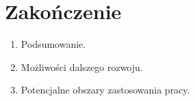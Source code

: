 \documentclass[data-science]{agh-wi} %
\newcounter{comment}[chapter]
\newenvironment{comment}[1][]{\begin{shaded}\refstepcounter{comment}
\noindent \textbf{Uwaga~\thechapter.\thecomment. #1} \rmfamily}{\end{shaded}}
\begin{document}
\chapter{Zakończenie}
\begin{enumerate}
    \item Podsumowanie.
    \item Możliwości dalszego rozwoju.
    \item Potencjalne obszary zastosowania pracy.
\end{enumerate}
\end{document}
